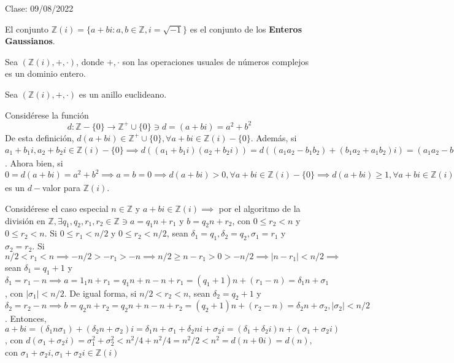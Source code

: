 Clase: 09/08/2022

\begin{definicion}
    El conjunto $\mathbb{Z}(i)=\{a+bi:a,b\in\mathbb{Z}, i =\sqrt{-1}\}$ es el conjunto de los \textbf{Enteros Gaussianos}. 
\end{definicion}

\begin{prop}
    Sea $(\mathbb{Z}(i),+,\cdot)$, donde $+,\cdot$ son las operaciones usuales de números complejos es un dominio entero. 
\end{prop}

\begin{teorema}[3F]
    Sea $(\mathbb{Z}(i),+,\cdot)$ es un anillo euclideano.
    \begin{dem}
        Considérese la función $$d:\mathbb{Z}-\{0\}\to\mathbb{Z}^+\cup \{0\}\ni d=(a+bi)=a^2+b^2$$
        De esta definición, $d(a+bi)\in\mathbb{Z}^+\cup\{0\},\forall a+bi\in\mathbb{Z}(i)-\{0\}$. Además, si $a_1+b_1i,a_2+b_2i\in \mathbb{Z}(i)-\{0\}\implies d((a_1+b_1i)(a_2+b_2i))=d((a_1a_2-b_1b_2)+(b_1a_2+a_1b_2)i)=(a_1a_2-b_1b_2)^2+(b_1a_2+ a_1b_2)^2=\cdots = a_1^2(a_2^2+b_2^2)+b_1^2(a_2^2+b_2^2)=(a_1^2+b_1^2)(a_2^2+b_2^2)=d(a_1+b_1i)d(a_2+b_2i)$. Ahora bien, si $0=d(a+bi)=a^2+b^2\implies a=b=0\implies d(a+bi)>0,\forall a+bi\in\mathbb{Z}(i)-\{0\}\implies d(a+bi)\geq 1,\forall a+bi\in\mathbb{Z}(i)-\{0\}\implies d(a_1+b_1i)d(a_2+b_2i)=(a_1^2+b_1^2)(a_2^2+b_2^2)\geq a_1^2+b_1^2=d(a_1+b_1i)\implies d$ es un $d-$valor para $\mathbb{Z}(i)$.\bigbreak 

        Considérese el caso especial $n\in\mathbb{Z}$ y $a+bi\in\mathbb{Z}(i)\implies$ por el algoritmo de la división en $\mathbb{Z},\exists q_1,q_2,r_1,r_2\in\mathbb{Z}\ni a=q_1n+r_1$ y $b=q_2n+r_2$, con $0\leq r_2<n$ y $0\leq r_2<n$. Si $0\leq r_1<n/2$ y $ 0\leq r_2<n/2$, sean $\delta_1=q_1,\delta_2=q_2,\sigma_1=r_1$ y $\sigma_2=r_2$. Si $n/2<r_1<n\implies -n/2>-r_1>-n \implies n/2\geq n-r_1>0>-n/2\implies |n-r_1|<n/2\implies$ sean $\delta_1=q_1+1$ y $\delta_1=r_1-n\implies a=1_1n+r_1=q_1n+n-n+r_1=(q_1+1)n+(r_1-n)=\delta_1n+\sigma_1$, con $|\sigma_1|<n/2$. De igual forma, si $n/2<r_2<n$, sean $\delta_2=q_2+1$ y $\delta_2=r_2-n\implies b=q_2n+r_2=q_2n+n-n+r_2=(q_2+1)n+(r_2-n)=\delta_2n+\sigma_2, |\sigma_2|<n/2$. Entonces, $a+bi = (\delta_1n\sigma_1)+(\delta_2n+\sigma_2)i =\delta_1 n+\sigma_1+\delta_2 ni+\sigma_2i = (\delta_1+\delta_2i)n+(\sigma_1+\sigma_2i)$, con $d(\sigma_1+\sigma_2i)=\sigma_1^2+\sigma_2^2<n^2/4+n^2/4=n^2/2<n^2=d(n+0i)=d(n),$ con $\sigma_1+\sigma_2i, \sigma_1+\sigma_2i\in\mathbb{Z}(i)$\bigbreak 


\end{dem}
\end{teorema}
